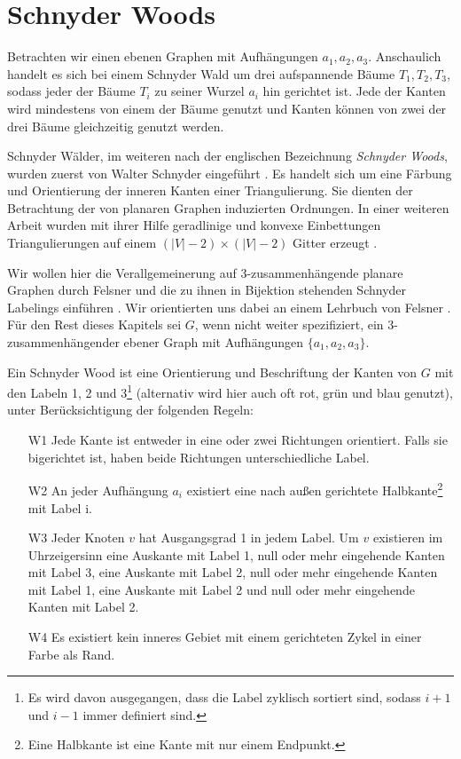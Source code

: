 \section{Schnyder Woods}\label{sw}
Betrachten wir einen ebenen Graphen mit Aufhängungen $a_1,a_2,a_3$. Anschaulich handelt es sich bei einem Schnyder Wald um drei aufspannende Bäume $T_1,T_2,T_3$, sodass jeder der Bäume $T_i$ zu seiner Wurzel $a_i$ hin gerichtet ist. Jede der Kanten wird mindestens von einem der Bäume genutzt und Kanten können von zwei der drei Bäume gleichzeitig genutzt werden.

Schnyder Wälder, im weiteren nach der englischen Bezeichnung \textit{Schnyder Woods}, wurden zuerst von Walter Schnyder eingeführt \cite{schnyder89}. Es handelt sich um eine Färbung und Orientierung der inneren Kanten einer Triangulierung. Sie dienten der Betrachtung der von planaren Graphen induzierten Ordnungen. In einer weiteren Arbeit wurden mit ihrer Hilfe geradlinige und konvexe Einbettungen Triangulierungen auf einem $(|V|-2)\times(|V|-2)$ Gitter erzeugt \cite{schnyder90}.

Wir wollen hier die Verallgemeinerung auf 3-zusammenhängende planare Graphen durch Felsner und die zu ihnen in Bijektion stehenden Schnyder Labelings einführen \cite{felsner01}. Wir orientierten uns dabei an einem Lehrbuch von Felsner \cite{felsner12}. Für den Rest dieses Kapitels sei $G$, wenn nicht weiter spezifiziert, ein 3-zusammenhängender ebener Graph mit Aufhängungen $\{a_1,a_2,a_3\}$.

\begin{definition}\label{def_sw}
Ein Schnyder Wood ist eine Orientierung und Beschriftung der Kanten von $G$ mit den Labeln 1, 2 und 3\footnote{Es wird davon ausgegangen, dass die Label zyklisch sortiert sind, sodass $i+1$ und $i-1$ immer definiert sind.} (alternativ wird hier auch oft rot, grün und blau genutzt), unter Berücksichtigung der folgenden Regeln:
\begin{itemize}
\item[W1] Jede Kante ist entweder in eine oder zwei Richtungen orientiert. Falls sie bigerichtet ist, haben beide Richtungen unterschiedliche Label.
\item[W2] An jeder Aufhängung  $a_i$ existiert eine nach außen gerichtete Halbkante\footnote{Eine Halbkante ist eine Kante mit nur einem Endpunkt.} mit Label i. 
\item[W3] Jeder Knoten $v$ hat Ausgangsgrad 1 in jedem Label. Um $v$ existieren im Uhrzeigersinn eine Auskante mit Label 1, null oder mehr eingehende Kanten mit Label 3, eine Auskante mit Label 2, null oder mehr  eingehende Kanten mit Label 1, eine Auskante mit Label 2 und null oder mehr  eingehende Kanten mit Label 2.
\item[W4] Es existiert kein inneres Gebiet mit einem gerichteten Zykel in einer Farbe als Rand.
\end{itemize}
\end{definition}

